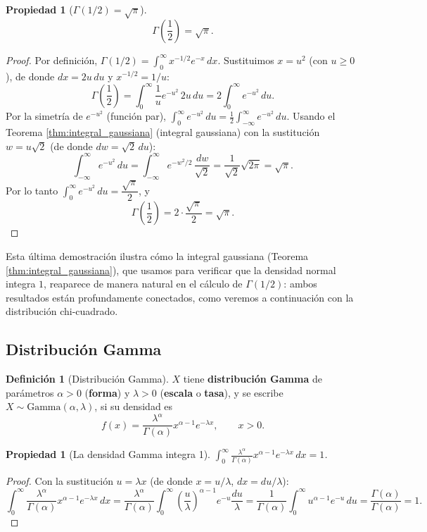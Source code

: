 \documentclass[11pt,a4paper]{article}
\theoremstyle{plain}
\newtheorem{propiedad}[teorema]{Propiedad}
\theoremstyle{definition}
\newtheorem{definicion}[teorema]{Definición}
\theoremstyle{remark}
\begin{document}
\begin{propiedad}[$\Gamma(1/2)=\sqrt{\pi}$]
$$\Gamma\left(\frac12\right)=\sqrt{\pi}.$$
\end{propiedad}
\begin{proof}
Por definición, $\Gamma(1/2)=\displaystyle\int_0^\infty x^{-1/2}e^{-x}\,dx$. Sustituimos $x=u^2$ (con $u\ge0$), de donde $dx=2u\,du$ y $x^{-1/2}=1/u$:
$$\Gamma\left(\frac12\right)=\int_0^\infty \frac{1}{u}e^{-u^2}\,2u\,du=2\int_0^\infty e^{-u^2}\,du.$$
Por la simetría de $e^{-u^2}$ (función par), $\displaystyle\int_0^\infty e^{-u^2}\,du=\frac12\int_{-\infty}^\infty e^{-u^2}\,du$. Usando el Teorema \ref{thm:integral_gaussiana} (integral gaussiana) con la sustitución $w=u\sqrt2$ (de donde $dw=\sqrt2\,du$):
$$\int_{-\infty}^{\infty}e^{-u^2}\,du=\int_{-\infty}^{\infty}e^{-w^2/2}\,\frac{dw}{\sqrt2}=\frac{1}{\sqrt2}\sqrt{2\pi}=\sqrt{\pi}.$$
Por lo tanto $\displaystyle\int_0^\infty e^{-u^2}\,du=\dfrac{\sqrt\pi}{2}$, y
$$\Gamma\left(\frac12\right)=2\cdot\frac{\sqrt\pi}{2}=\sqrt\pi.$$
\end{proof}

Esta última demostración ilustra cómo la integral gaussiana (Teorema \ref{thm:integral_gaussiana}), que usamos para verificar que la densidad normal integra $1$, reaparece de manera natural en el cálculo de $\Gamma(1/2)$: ambos resultados están profundamente conectados, como veremos a continuación con la distribución chi-cuadrado.

\subsection{Distribución Gamma}

\begin{definicion}[Distribución Gamma]
$X$ tiene \textbf{distribución Gamma} de parámetros $\alpha>0$ (\textbf{forma}) y $\lambda>0$ (\textbf{escala} o \textbf{tasa}), y se escribe $X\sim\text{Gamma}(\alpha,\lambda)$, si su densidad es
$$f(x)=\frac{\lambda^\alpha}{\Gamma(\alpha)}x^{\alpha-1}e^{-\lambda x},\qquad x>0.$$
\end{definicion}

\begin{propiedad}[La densidad Gamma integra 1]
$\displaystyle\int_0^\infty\frac{\lambda^\alpha}{\Gamma(\alpha)}x^{\alpha-1}e^{-\lambda x}\,dx=1$.
\end{propiedad}
\begin{proof}
Con la sustitución $u=\lambda x$ (de donde $x=u/\lambda$, $dx=du/\lambda$):
$$\int_0^\infty\frac{\lambda^\alpha}{\Gamma(\alpha)}x^{\alpha-1}e^{-\lambda x}\,dx=\frac{\lambda^\alpha}{\Gamma(\alpha)}\int_0^\infty\left(\frac{u}{\lambda}\right)^{\alpha-1}e^{-u}\frac{du}{\lambda}=\frac{1}{\Gamma(\alpha)}\int_0^\infty u^{\alpha-1}e^{-u}\,du=\frac{\Gamma(\alpha)}{\Gamma(\alpha)}=1.$$
\end{proof}
\end{document}
